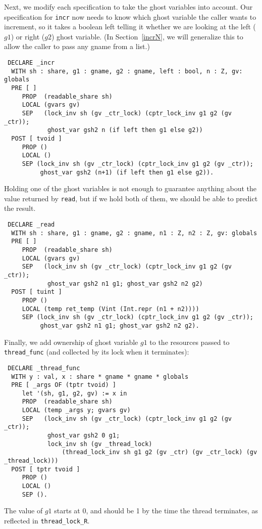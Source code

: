 \documentclass[11pt]{article}
\begin{document}
Next, we modify each specification to take the ghost variables into account. Our specification for \texttt{incr} now needs to know which ghost variable the caller wants to increment, so it takes a boolean \textsf{left} telling it whether we are looking at the left ($g1$) or right ($g2$) ghost variable. (In Section~\ref{incrN}, we will generalize this to allow the caller to pass any \textsf{gname} from a list.)
\begin{verbatim}
 DECLARE _incr
  WITH sh : share, g1 : gname, g2 : gname, left : bool, n : Z, gv: globals
  PRE [ ]
     PROP  (readable_share sh)
     LOCAL (gvars gv)
     SEP   (lock_inv sh (gv _ctr_lock) (cptr_lock_inv g1 g2 (gv _ctr));
            ghost_var gsh2 n (if left then g1 else g2))
  POST [ tvoid ]
     PROP ()
     LOCAL ()
     SEP (lock_inv sh (gv _ctr_lock) (cptr_lock_inv g1 g2 (gv _ctr));
          ghost_var gsh2 (n+1) (if left then g1 else g2)).
\end{verbatim}

Holding one of the ghost variables is not enough to guarantee anything about the value returned by \texttt{read}, but if we hold both of them, we should be able to predict the result.
\begin{verbatim}
 DECLARE _read
  WITH sh : share, g1 : gname, g2 : gname, n1 : Z, n2 : Z, gv: globals
  PRE [ ]
     PROP  (readable_share sh)
     LOCAL (gvars gv)
     SEP   (lock_inv sh (gv _ctr_lock) (cptr_lock_inv g1 g2 (gv _ctr));
            ghost_var gsh2 n1 g1; ghost_var gsh2 n2 g2)
  POST [ tuint ]
     PROP ()
     LOCAL (temp ret_temp (Vint (Int.repr (n1 + n2))))
     SEP (lock_inv sh (gv _ctr_lock) (cptr_lock_inv g1 g2 (gv _ctr));
          ghost_var gsh2 n1 g1; ghost_var gsh2 n2 g2).
\end{verbatim}

Finally, we add ownership of ghost variable $g1$ to the resources passed to \texttt{thread\_func} (and collected by its lock when it terminates):
\begin{verbatim}
 DECLARE _thread_func
  WITH y : val, x : share * gname * gname * globals
  PRE [ _args OF (tptr tvoid) ]
     let '(sh, g1, g2, gv) := x in
     PROP  (readable_share sh)
     LOCAL (temp _args y; gvars gv)
     SEP   (lock_inv sh (gv _ctr_lock) (cptr_lock_inv g1 g2 (gv _ctr));
            ghost_var gsh2 0 g1;
            lock_inv sh (gv _thread_lock)
                (thread_lock_inv sh g1 g2 (gv _ctr) (gv _ctr_lock) (gv _thread_lock)))
  POST [ tptr tvoid ]
     PROP ()
     LOCAL ()
     SEP ().
\end{verbatim}
The value of $g1$ starts at 0, and should be 1 by the time the thread terminates, as reflected in \texttt{thread\_lock\_R}.
\end{document}
